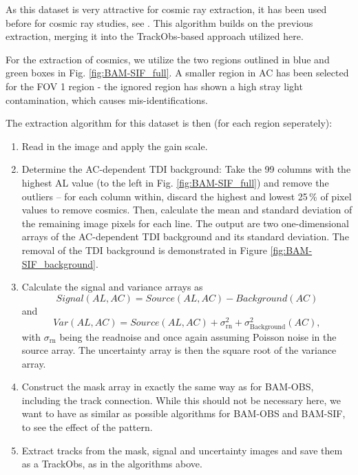 \documentclass[a4paper, 11pt]{article}
\begin{document}
As this dataset is very attractive for cosmic ray extraction, it has been used before for cosmic ray studies, see \cite{GAIA-DE-TN-ESAC-RKO-033}. This algorithm builds on the previous extraction, merging it into the TrackObs-based approach utilized here.

For the extraction of cosmics, we utilize the two regions outlined in blue and green boxes in Fig. \ref{fig:BAM-SIF_full}. A smaller region in AC has been selected for the FOV 1 region - the ignored region has shown a high stray light contamination, which causes mis-identifications.

The extraction algorithm for this dataset is then (for each region seperately):
\begin{enumerate}
  \item Read in the image and apply the gain scale.
  \item Determine the AC-dependent TDI background: Take the 99 columns with the highest AL value (to the left in Fig. \ref{fig:BAM-SIF_full}) and remove the outliers -- for each column within, discard the highest and lowest 25\,\% of pixel values to remove cosmics. Then, calculate the mean and standard deviation of the remaining image pixels for each line. The output are two one-dimensional arrays of the AC-dependent TDI background and its standard deviation.
    The removal of the TDI background is demonstrated in Figure \ref{fig:BAM-SIF_background}.
  \item Calculate the signal and variance arrays as
    \begin{equation}
      Signal\left( AL,AC \right) = Source\left( AL,AC \right) - Background\left(AC \right)
    \end{equation}
    and
    \begin{equation}
      Var\left( AL,AC \right) = Source\left( AL,AC \right) + \sigma_\mathrm{rn}^{2} + \sigma_\mathrm{Background}^{2}\left( AC \right),
    \end{equation}
    with $\sigma_\mathrm{rn}$ being the readnoise and once again assuming Poisson noise in the source array. The uncertainty array is then the square root of the variance array.
  \item Construct the mask array in exactly the same way as for BAM-OBS, including the track connection. While this should not be necessary here, we want to have as similar as possible algorithms for BAM-OBS and BAM-SIF, to see the effect of the pattern.
  \item Extract tracks from the mask, signal and uncertainty images and save them as a TrackObs, as in the algorithms above.
\end{enumerate}
\end{document}
